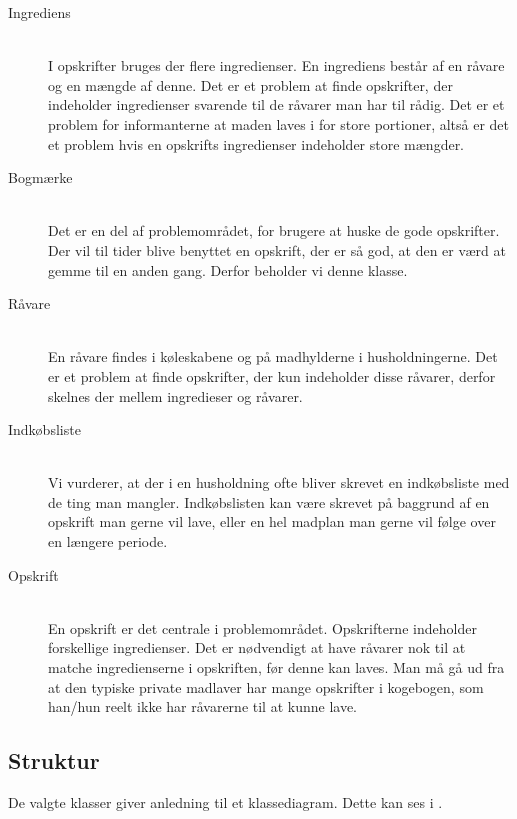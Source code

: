 \begin{description}
\item[Ingrediens] \hfill \\ 
I opskrifter bruges der flere ingredienser. En ingrediens består af en råvare og en mængde af denne. Det er et problem at finde opskrifter, der indeholder ingredienser svarende til de råvarer man har til rådig. Det er et problem for informanterne at maden laves i for store portioner, altså er det et problem hvis en opskrifts ingredienser indeholder store mængder.

\item[Bogmærke] \hfill \\
Det er en del af problemområdet, for brugere at huske de gode opskrifter. Der vil til tider blive benyttet en opskrift, der er så god, at den er værd at gemme til en anden gang. Derfor beholder vi denne klasse.

\item[Råvare] \hfill \\
En råvare findes i køleskabene og på madhylderne i husholdningerne. Det er et problem at finde opskrifter, der kun indeholder disse råvarer, derfor skelnes der mellem ingredieser og råvarer.

\item[Indkøbsliste] \hfill \\
Vi vurderer, at der i en husholdning ofte bliver skrevet en indkøbsliste med de ting man mangler. Indkøbslisten kan være skrevet på baggrund af en opskrift man gerne vil lave, eller en hel madplan man gerne vil følge over en længere periode.

\item[Opskrift] \hfill \\
En opskrift er det centrale i problemområdet. Opskrifterne indeholder forskellige ingredienser. Det er nødvendigt at have råvarer nok til at matche ingredienserne i opskriften, før denne kan laves. Man må gå ud fra at den typiske private madlaver har mange opskrifter i kogebogen, som han/hun reelt ikke har råvarerne til at kunne lave.
\end{description}

\subsection{Struktur}

De valgte klasser giver anledning til et klassediagram. Dette kan ses i . 



